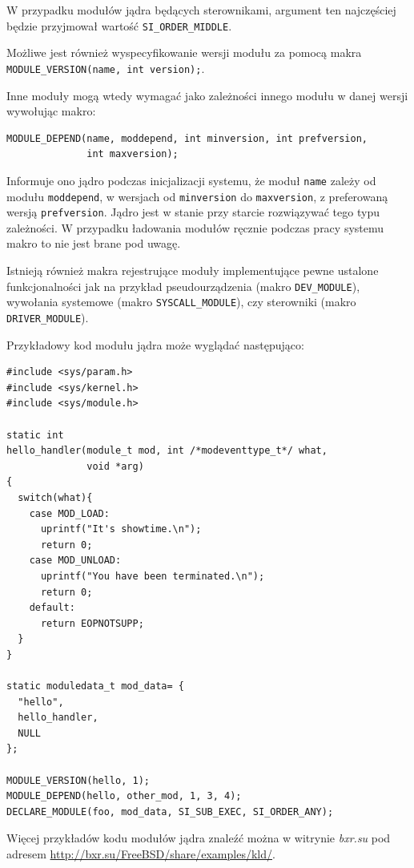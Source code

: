 \documentclass[shortabstract,inz]{iithesis}
\begin{document}
W przypadku modułów jądra będących sterownikami, argument ten najczęściej będzie przyjmował
wartość \texttt{SI\_ORDER\_MIDDLE}.

Możliwe jest również wyspecyfikowanie wersji modułu za pomocą makra \\
\texttt{MODULE\_VERSION(name, int version);}.

Inne moduły mogą wtedy wymagać jako zależności innego modułu w danej wersji
wywołując makro:

\begin{lstlisting}
MODULE_DEPEND(name, moddepend, int minversion, int prefversion,
              int maxversion);
\end{lstlisting}

Informuje ono jądro podczas inicjalizacji systemu, że moduł \texttt{name} zależy od 
modułu \texttt{moddepend}, w wersjach od \texttt{minversion} do \texttt{maxversion}, 
z preferowaną wersją \texttt{prefversion}. Jądro jest w stanie przy starcie rozwiązywać
tego typu zależności. W przypadku ładowania modułów ręcznie podczas pracy systemu
makro to nie jest brane pod uwagę.

Istnieją również makra rejestrujące moduły implementujące pewne ustalone funkcjonalności
jak na przykład pseudourządzenia (makro \texttt{DEV\_MODULE}), wywołania systemowe
(makro \texttt{SYSCALL\_MODULE}), czy sterowniki (makro \texttt{DRIVER\_MODULE}).

Przykładowy kod modułu jądra może wyglądać następująco:

\begin{lstlisting}
#include <sys/param.h>
#include <sys/kernel.h>
#include <sys/module.h>

static int 
hello_handler(module_t mod, int /*modeventtype_t*/ what, 
              void *arg)
{
  switch(what){
    case MOD_LOAD:
      uprintf("It's showtime.\n");
      return 0;
    case MOD_UNLOAD:
      uprintf("You have been terminated.\n");
      return 0;
    default:
      return EOPNOTSUPP;
  }
}

static moduledata_t mod_data= {
  "hello",
  hello_handler,
  NULL
};

MODULE_VERSION(hello, 1);
MODULE_DEPEND(hello, other_mod, 1, 3, 4);
DECLARE_MODULE(foo, mod_data, SI_SUB_EXEC, SI_ORDER_ANY);
\end{lstlisting}
\newpage
Więcej przykładów kodu modułów jądra znaleźć można w witrynie \textit{bxr.su} pod adresem
\url{http://bxr.su/FreeBSD/share/examples/kld/}.
\end{document}
